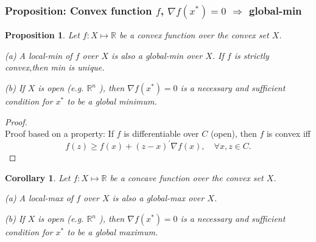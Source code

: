 \documentclass[11pt,a4paper]{article}
\newtheorem{proposition}{Proposition}
\newtheorem{corollary}{Corollary}
\begin{document}
\subsubsection{Proposition: Convex function $f$, $\nabla f(x^*)=0$ $\Rightarrow$ global-min}
\begin{proposition}
    Let $f: X \longmapsto \mathbb{R}$ be a convex function over the convex set $X$.

    (a) A local-min of $f$ over $X$ is also a global-min over $X$. If $f$ is strictly convex,then min is unique.

    (b) If $X$ is open (e.g. $\mathbb{R}^{n}$ ), then $\nabla f\left(x^{*}\right)=0$ is a necessary and sufficient condition for $x^{*}$ to be a global minimum.
\end{proposition}
\begin{proof}
\quad\\
Proof based on a property: If $f$ is differentiable over $C$ (open), then $f$ is convex iff
$$
f(z) \geq f(x)+(z-x)^{\prime} \nabla f(x), \quad \forall x, z \in C .
$$
\end{proof}














\begin{corollary}
    Let $f: X \longmapsto \mathbb{R}$ be a concave function over the convex set $X$.

    (a) A local-max of $f$ over $X$ is also a global-max over $X$.

    (b) If $X$ is open (e.g. $\mathbb{R}^{n}$ ), then $\nabla f\left(x^{*}\right)=0$ is a necessary and sufficient condition for $x^{*}$ to be a global maximum.
\end{corollary}
\end{document}
